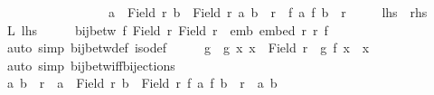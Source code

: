 \begin{isabellebody}
\ \ \ \ \ \ \ \ \ \ \ \ \ \ \ \ \ {\isacharparenleft}{\kern0pt}{\isasymforall}a\ {\isasymin}\ Field\ r{\isachardot}{\kern0pt}\ {\isasymforall}b\ {\isasymin}\ Field\ r{\isachardot}{\kern0pt}\ {\isacharparenleft}{\kern0pt}a{\isacharcomma}{\kern0pt}\ b{\isacharparenright}{\kern0pt}\ {\isasymin}\ r\ {\isasymlongleftrightarrow}\ {\isacharparenleft}{\kern0pt}f\ a{\isacharcomma}{\kern0pt}\ f\ b{\isacharparenright}{\kern0pt}\ {\isasymin}\ r{\isacharprime}{\kern0pt}{\isacharparenright}{\kern0pt}{\isachardoublequoteclose}\isanewline
\ \ \ \ {\isacharparenleft}{\kern0pt}\ {\isachardoublequoteopen}{\isacharquery}{\kern0pt}lhs\ {\isacharequal}{\kern0pt}\ {\isacharquery}{\kern0pt}rhs{\isachardoublequoteclose}{\isacharparenright}{\kern0pt}\isanewline
%
\isadelimproof
%
\endisadelimproof
%
\isatagproof
{}\isamarkupfalse%
\isanewline
\ \ \isamarkupfalse%
\ L{\isacharcolon}{\kern0pt}\ {\isacharquery}{\kern0pt}lhs\isanewline
\ \ \isamarkupfalse%
\ \isamarkupfalse%
\ {\isachardoublequoteopen}bij{\isacharunderscore}{\kern0pt}betw\ f\ {\isacharparenleft}{\kern0pt}Field\ r{\isacharparenright}{\kern0pt}\ {\isacharparenleft}{\kern0pt}Field\ r{\isacharprime}{\kern0pt}{\isacharparenright}{\kern0pt}{\isachardoublequoteclose}\ \ emb{\isacharcolon}{\kern0pt}\ {\isachardoublequoteopen}embed\ r\ r{\isacharprime}{\kern0pt}\ f{\isachardoublequoteclose}\isanewline
\ \ \ \ \isamarkupfalse%
\ {\isacharparenleft}{\kern0pt}auto\ simp{\isacharcolon}{\kern0pt}\ bij{\isacharunderscore}{\kern0pt}betw{\isacharunderscore}{\kern0pt}def\ iso{\isacharunderscore}{\kern0pt}def{\isacharparenright}{\kern0pt}\isanewline
\ \ \isamarkupfalse%
\ \isamarkupfalse%
\ g\ \ g{\isacharcolon}{\kern0pt}\ {\isachardoublequoteopen}{\isasymAnd}x{\isachardot}{\kern0pt}\ x\ {\isasymin}\ Field\ r\ {\isasymLongrightarrow}\ g\ {\isacharparenleft}{\kern0pt}f\ x{\isacharparenright}{\kern0pt}\ {\isacharequal}{\kern0pt}\ x{\isachardoublequoteclose}\isanewline
\ \ \ \ \isamarkupfalse%
\ {\isacharparenleft}{\kern0pt}auto\ simp{\isacharcolon}{\kern0pt}\ bij{\isacharunderscore}{\kern0pt}betw{\isacharunderscore}{\kern0pt}iff{\isacharunderscore}{\kern0pt}bijections{\isacharparenright}{\kern0pt}\isanewline
\ \ \isamarkupfalse%
\isanewline
\ \ \isamarkupfalse%
\ {\isachardoublequoteopen}{\isacharparenleft}{\kern0pt}a{\isacharcomma}{\kern0pt}\ b{\isacharparenright}{\kern0pt}\ {\isasymin}\ r{\isachardoublequoteclose}\ \ {\isachardoublequoteopen}a\ {\isasymin}\ Field\ r{\isachardoublequoteclose}\ {\isachardoublequoteopen}b\ {\isasymin}\ Field\ r{\isachardoublequoteclose}\ {\isachardoublequoteopen}{\isacharparenleft}{\kern0pt}f\ a{\isacharcomma}{\kern0pt}\ f\ b{\isacharparenright}{\kern0pt}\ {\isasymin}\ r{\isacharprime}{\kern0pt}{\isachardoublequoteclose}\ \ a\ b\ \isanewline

\end{isabellebody}
